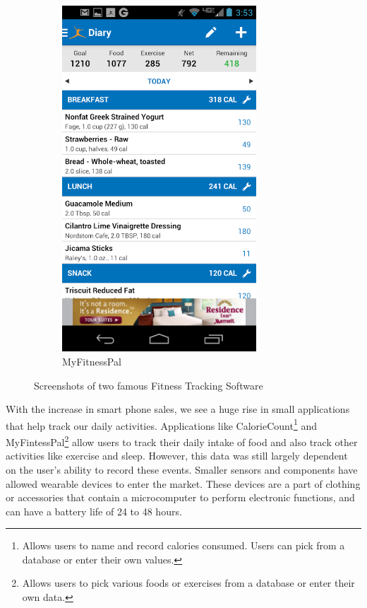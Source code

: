\begin{figure}
\begin{subfigure}[b]{0.4\textwidth}
\includegraphics[width=0.8\textwidth]{images/MyFitScreenshot.png}
\caption{MyFitnessPal}
\label{fig:MyFitScreenshot}
\end{subfigure}
\caption{Screenshots of two famous Fitness Tracking Software}
\label{fig:FitnessScreenshots}
\end{figure}
With the increase in smart phone sales, we see a huge rise in small applications that help track our daily activities. Applications like CalorieCount\footnote{Allows users to name and record calories consumed. Users can pick from a database or enter their own values.} and MyFintessPal\footnote{Allows users to pick various foods or exercises from a database or enter their own data.} allow users to track their daily intake of food and also track other activities like exercise and sleep. However, this data was still largely dependent on the user's ability to record these events.
Smaller sensors and components have allowed wearable devices to enter the market. These devices are a part of clothing or accessories  that contain a microcomputer to perform electronic functions, and can have a battery life of 24 to 48 hours.


